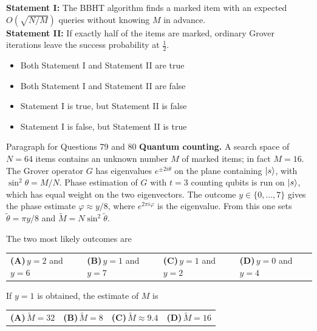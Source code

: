\documentclass[11pt,a4paper]{article}
\newcommand{\optlabel}[1]{\textbf{(#1)}}
\newenvironment{qitem}[1]{\begin{list}{}{\setlength{\leftmargin}{3.3em}\setlength{\labelwidth}{3.1em}%
  \setlength{\labelsep}{0.2em}\setlength{\topsep}{3pt}\setlength{\parsep}{3pt}}\item[\textbf{Q.#1}\hfill]}{\end{list}}
\newcommand{\qsep}{\par\vspace{2pt}{\color{black!15}\hrule}\vspace{4pt}}
\begin{document}
\begin{qitem}{78}
\textbf{Statement I:} The BBHT algorithm finds a marked item with an expected $O(\sqrt{N/M})$ queries without knowing $M$ in advance.\\[1mm]
\textbf{Statement II:} If exactly half of the items are marked, ordinary Grover iterations leave the success probability at $\frac12$.
\begin{itemize}[leftmargin=2.6em, labelsep=0.4em, itemsep=2pt, topsep=3pt]
\item[\optlabel{A}] Both Statement I and Statement II are true
\item[\optlabel{B}] Both Statement I and Statement II are false
\item[\optlabel{C}] Statement I is true, but Statement II is false
\item[\optlabel{D}] Statement I is false, but Statement II is true
\end{itemize}
\end{qitem}
\qsep

\begin{passagebox}{Paragraph for Questions 79 and 80}
\textbf{Quantum counting.} A search space of $N = 64$ items contains an unknown number $M$ of marked items; in fact $M = 16$. The Grover operator $G$ has
eigenvalues $e^{\pm 2i\theta}$ on the plane containing $\ket{s}$, with $\sin^2\theta = M/N$. Phase estimation of $G$ with $t = 3$ counting qubits is run on $\ket{s}$, which has equal weight on the two eigenvectors. The outcome $y \in \{0, \dots, 7\}$ gives the
phase estimate $\varphi \approx y/8$, where $e^{2\pi i\varphi}$ is the eigenvalue. From this one sets $\tilde\theta = \pi y/8$ and $\tilde M = N\sin^2\tilde\theta$.
\end{passagebox}
\begin{qitem}{79}
The two most likely outcomes are
\par\smallskip\noindent\begin{tabularx}{\linewidth}{@{}*{4}{L}@{}}
\optlabel{A}\,$y = 2$ and $y = 6$ & \optlabel{B}\,$y = 1$ and $y = 7$ & \optlabel{C}\,$y = 1$ and $y = 2$ & \optlabel{D}\,$y = 0$ and $y = 4$
\end{tabularx}
\end{qitem}
\qsep

\begin{qitem}{80}
If $y = 1$ is obtained, the estimate of $M$ is
\par\smallskip\noindent\begin{tabularx}{\linewidth}{@{}*{4}{L}@{}}
\optlabel{A}\,$\tilde M = 32$ & \optlabel{B}\,$\tilde M = 8$ & \optlabel{C}\,$\tilde M \approx 9.4$ & \optlabel{D}\,$\tilde M = 16$
\end{tabularx}
\end{qitem}
\qsep

\newpage
\end{document}
